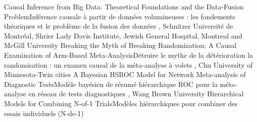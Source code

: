 {
}
{Causal Inference from Big Data: Theoretical Foundations and the Data-Fusion Problem}{Inférence causale à partir de données volumineuses : les fondements théoriques et le problème de la fusion des données}
{\bubbleE \enspace \screenE}
{
,  {Schnitzer}
{Université de Montréal},  {Shrier}
{Lady Davis Institute, Jewish General Hospital, Montreal and McGill University}
}
{Breaking the Myth of Breaking Randomization: A Causal Examination of Arm-Based Meta-Analysis}{Détruire le mythe de la détérioration la randomisation : un examen causal de la méta-analyse à volets}
{\bubbleE \enspace \screenE}
{
,  {Chu}
{University of Minnesota-Twin cities}
}
{A Bayesian HSROC Model for Network Meta-analysis of Diagnostic Tests}{Modèle bayésien de résumé hiérarchique ROC pour la méta-analyse en réseau de tests diagnostiques}
{\bubbleE \enspace \screenE}
{
,  {Wang}
{Brown University}
}
{Hierarchical Models for Combining N-of-1 Trials}{Modèles hiérarchiques pour combiner des essais individuels (N-de-1)}
{\bubbleE \enspace \screenE}




